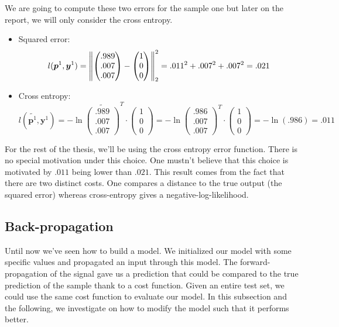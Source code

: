 		\vskip 1cm
		We are going to compute these two errors for the sample one but later on the report, we will only consider the cross entropy.
		\begin{itemize}
			\item Squared error: $$ l(\boldsymbol{p}^1,\boldsymbol{y}^1) =  
									\left\lVert
									\left( \begin{matrix} .989 \\ .007 \\ .007 \end{matrix}\right) - 
									\left( \begin{matrix} 1    \\ 0    \\ 0    \end{matrix}\right) \right\rVert_2^2 = 
									.011^2 + .007^2 + .007^2 = .021 $$
			\item Cross entropy: $$ l(\widetilde{\boldsymbol{p}^1},\boldsymbol{y}^1) = 
									- \ln
								 	\widetilde{\left( \begin{matrix} .989 \\ .007 \\ .007 \end{matrix}\right)}^T \cdot 
									\left( \begin{matrix} 1    \\ 0    \\ 0    \end{matrix}\right) = 
									- \ln
								 	\left( \begin{matrix} .986 \\ .007 \\ .007 \end{matrix}\right)^T \cdot 
									\left( \begin{matrix} 1    \\ 0    \\ 0    \end{matrix}\right) = 
									-\ln(.986) = .011
									$$
		\end{itemize}
		
		For the rest of the thesis, we'll be using the cross entropy error function. There is no special motivation under this choice. One mustn't believe that this choice is motivated by $.011$ being lower than $.021$. This result comes from the fact that there are two distinct costs. One compares a distance to the true output (the squared error) whereas cross-entropy gives a negative-log-likelihood.


	\subsection{Back-propagation}
	\label{sec:back_propagation}
		Until now we've seen how to build a model. We initialized our model with some specific values and propagated an input through this model. The forward-propagation of the signal gave us a prediction that could be compared to the true prediction of the sample thank to a cost function. Given an entire test set, we could use the same cost function to evaluate our model. In this subsection and the following, we investigate on how to modify the model such that it performs better.

